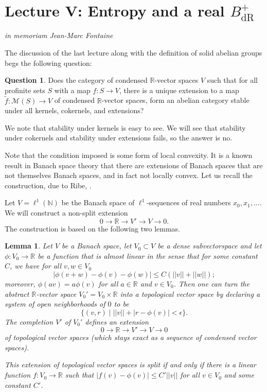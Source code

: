 \documentclass[11pt]{amsbook}
\renewcommand*{\tilde}{\widetilde}
\numberwithin{equation}{section}
\numberwithin{theorem}{section}
\newtheorem{lemma}[theorem]{Lemma}
\theoremstyle{definition}
\newtheorem{question}[theorem]{Question}
\begin{document}
\newpage

\section{Lecture V: Entropy and a real $B_{\mathrm{dR}}^+$}
\begin{center}
{\it in memoriam Jean-Marc Fontaine}
\end{center}

The discussion of the last lecture along with the definition of solid abelian groups begs the following question:

\begin{question} Does the category of condensed $\mathbb R$-vector spaces $V$ such that for all profinite sets $S$ with a map $f: S\to V$, there is a unique extension to a map $\tilde{f}: \mathcal M(S)\to V$ of condensed $\mathbb R$-vector spaces, form an abelian category stable under all kernels, cokernels, and extensions?
\end{question}

We note that stability under kernels is easy to see. We will see that stability under cokernels and stability under extensions fails, so the answer is no.

Note that the condition imposed is some form of local convexity. It is a known result in Banach space theory that there are extensions of Banach spaces that are not themselves Banach spaces, and in fact not locally convex. Let us recall the construction, due to Ribe, \cite{Ribe}.

Let $V=\ell^1(\mathbb N)$ be the Banach space of $\ell^1$-sequences of real numbers $x_0,x_1,\ldots$. We will construct a non-split extension
\[
0\to \mathbb R\to V'\to V\to 0.
\]
The construction is based on the following two lemmas.

\begin{lemma} Let $V$ be a Banach space, let $V_0\subset V$ be a dense subvectorspace and let $\phi: V_0\to \mathbb R$ be a function that is almost linear in the sense that for some constant $C$, we have for all $v,w\in V_0$
\[
|\phi(v+w)-\phi(v)-\phi(w)|\leq C(||v||+||w||);
\]
moreover, $\phi(av)=a\phi(v)$ for all $a\in \mathbb R$ and $v\in V_0$. Then one can turn the abstract $\mathbb R$-vector space $V_0'=V_0\times \mathbb R$ into a topological vector space by declaring a system of open neighborhoods of $0$ to be
\[
\{(v,r)\mid ||v||+|r-\phi(v)|<\epsilon\}.
\]
The completion $V'$ of $V_0'$ defines an extension
\[
0\to \mathbb R\to V'\to V\to 0
\]
of topological vector spaces (which stays exact as a sequence of condensed vector spaces).

This extension of topological vector spaces is split if and only if there is a linear function $f: V_0\to \mathbb R$ such that $|f(v)-\phi(v)|\leq C'||v||$ for all $v\in V_0$ and some constant $C'$.
\end{lemma}
\end{document}
